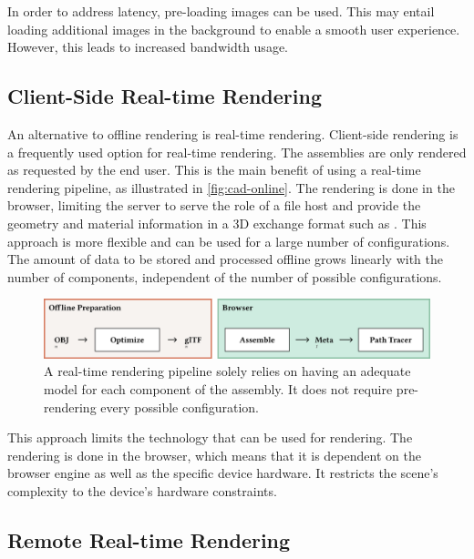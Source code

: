 In order to address latency, pre-loading images can be used. This may entail loading additional images in the background to enable a smooth user experience. However, this leads to increased bandwidth usage.

\subsection*{Client-Side Real-time Rendering}

An alternative to offline rendering is real-time rendering. Client-side rendering is a frequently used option for real-time rendering. The assemblies are only rendered as requested by the end user. This is the main benefit of using a real-time rendering pipeline, as illustrated in \autoref{fig:cad-online}. The rendering is done in the browser, limiting the server to serve the role of a file host and provide the geometry and material information in a 3D exchange format such as . This approach is more flexible and can be used for a large number of configurations. The amount of data to be stored and processed offline grows linearly with the number of components, independent of the number of possible configurations.

\begin{figure}[H]
  \includegraphics[width=\columnwidth]{resources/cad-pipeline-online.png}
  \caption{A real-time rendering pipeline solely relies on having an adequate model for each component of the assembly. It does not require pre-rendering every possible configuration.}
  \label{fig:cad-online}
\end{figure}

This approach limits the technology that can be used for rendering. The rendering is done in the browser, which means that it is dependent on the browser engine as well as the specific device hardware. It restricts the scene's complexity to the device's hardware constraints.

\subsection*{Remote Real-time Rendering}

